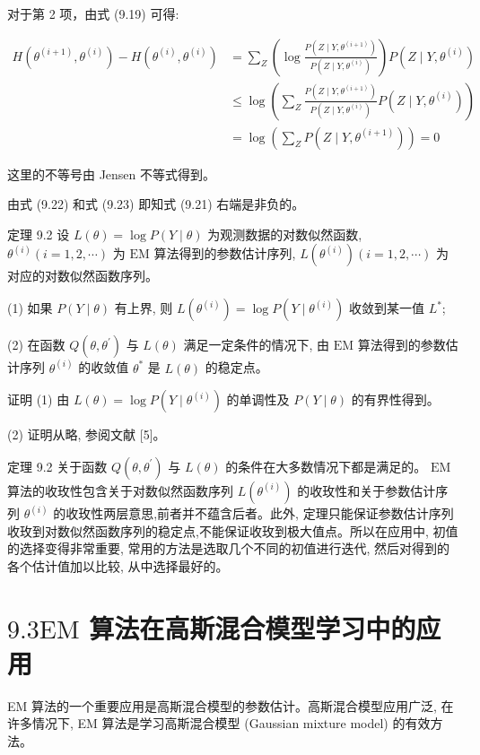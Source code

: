 \documentclass[10pt]{article}
\begin{document}
对于第 2 项，由式 (9.19) 可得:


\begin{align*}
H\left(\theta^{(i+1)}, \theta^{(i)}\right)-H\left(\theta^{(i)}, \theta^{(i)}\right) & =\sum_{Z}\left(\log \frac{P\left(Z \mid Y, \theta^{(i+1)}\right)}{P\left(Z \mid Y, \theta^{(i)}\right)}\right) P\left(Z \mid Y, \theta^{(i)}\right) \\
& \leqslant \log \left(\sum_{Z} \frac{P\left(Z \mid Y, \theta^{(i+1)}\right)}{P\left(Z \mid Y, \theta^{(i)}\right)} P\left(Z \mid Y, \theta^{(i)}\right)\right) \\
& =\log \left(\sum_{Z} P\left(Z \mid Y, \theta^{(i+1)}\right)\right)=0 \tag{9.23}
\end{align*}


这里的不等号由 Jensen 不等式得到。

由式 (9.22) 和式 (9.23) 即知式 (9.21) 右端是非负的。

定理 9.2 设 $L(\theta)=\log P(Y \mid \theta)$ 为观测数据的对数似然函数, $\theta^{(i)}(i=1,2, \cdots)$ 为 $\mathrm{EM}$ 算法得到的参数估计序列, $L\left(\theta^{(i)}\right)(i=1,2, \cdots)$ 为对应的对数似然函数序列。

(1) 如果 $P(Y \mid \theta)$ 有上界, 则 $L\left(\theta^{(i)}\right)=\log P\left(Y \mid \theta^{(i)}\right)$ 收敛到某一值 $L^{*}$;

(2) 在函数 $Q\left(\theta, \theta^{\prime}\right)$ 与 $L(\theta)$ 满足一定条件的情况下, 由 $\mathrm{EM}$ 算法得到的参数估计序列 $\theta^{(i)}$ 的收敛值 $\theta^{*}$ 是 $L(\theta)$ 的稳定点。

证明 (1) 由 $L(\theta)=\log P\left(Y \mid \theta^{(i)}\right)$ 的单调性及 $P(Y \mid \theta)$ 的有界性得到。

(2) 证明从略, 参阅文献 [5]。

定理 9.2 关于函数 $Q\left(\theta, \theta^{\prime}\right)$ 与 $L(\theta)$ 的条件在大多数情况下都是满足的。 $\mathrm{EM}$ 算法的收玫性包含关于对数似然函数序列 $L\left(\theta^{(i)}\right)$ 的收玫性和关于参数估计序列 $\theta^{(i)}$ 的收玫性两层意思,前者并不蕴含后者。此外, 定理只能保证参数估计序列收玫到对数似然函数序列的稳定点,不能保证收玫到极大值点。所以在应用中, 初值的选择变得非常重要, 常用的方法是选取几个不同的初值进行迭代, 然后对得到的各个估计值加以比较, 从中选择最好的。

\section*{$9.3 \mathrm{EM}$ 算法在高斯混合模型学习中的应用}
EM 算法的一个重要应用是高斯混合模型的参数估计。高斯混合模型应用广泛, 在许多情况下, EM 算法是学习高斯混合模型 (Gaussian mixture model) 的有效方法。
\end{document}
